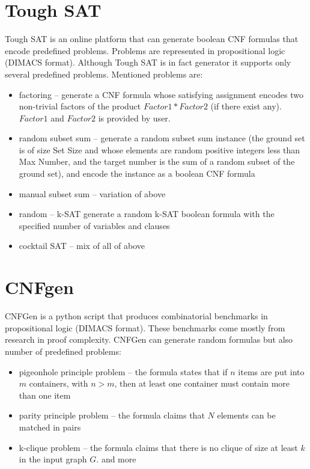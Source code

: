 \section{Tough SAT}

Tough SAT \cite{ToughSAT} is an online platform that can generate boolean CNF formulas that encode predefined problems. Problems are represented in propositional logic (DIMACS format). Although Tough SAT is in fact generator it supports only several predefined problems. Mentioned problems are:
\begin{itemize}
  \item factoring -- generate a CNF formula whose satisfying assignment encodes two non-trivial factors of the product $Factor1*Factor2$ (if there exist any). $Factor1$ and $Factor2$ is provided by user.
  \item random subset sum -- generate a random subset sum instance (the ground set is of size Set Size and whose elements are random positive integers less than Max Number, and the target number is the sum of a random subset of the ground set), and encode the instance as a boolean CNF formula
  \item manual subset sum -- variation of above
  \item random -- k-SAT generate a random k-SAT boolean formula with the specified number of variables and clauses
  \item cocktail SAT -- mix of all of above
\end{itemize}


\section{CNFgen}

CNFGen \cite{CNFGen} is a python script that produces combinatorial benchmarks in propositional logic (DIMACS format). These benchmarks come mostly from research in proof complexity. CNFGen can generate random formulas but also number of predefined problems:
\begin{itemize}
  \item pigeonhole principle problem -- the formula states that if $n$ items are put into $m$ containers, with $n > m$,  then at least one container must contain more than one item
  \item parity principle problem -- the formula claims that $N$ elements can be matched in pairs
  \item k-clique problem -- the formula claims that there is no clique of size at least $k$ in the input graph $G$. and more
\end{itemize}

